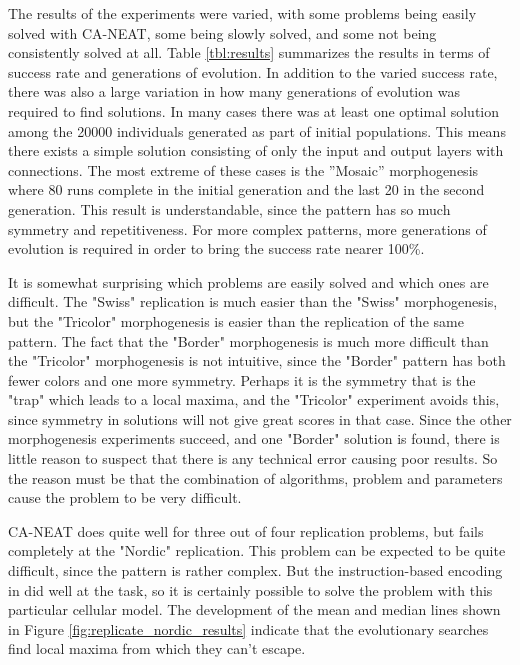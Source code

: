 The results of the experiments were varied, with some problems being easily solved with CA-NEAT, some being slowly solved, and some not being consistently solved at all.
Table \ref{tbl:results} summarizes the results in terms of success rate and generations of evolution.
In addition to the varied success rate, there was also a large variation in how many generations of evolution was required to find solutions.
In many cases there was at least one optimal solution among the 20000 individuals generated as part of initial populations.
This means there exists a simple solution consisting of only the input and output layers with connections. 
The most extreme of these cases is the ”Mosaic” morphogenesis where 80 runs complete in the initial generation and the last 20 in the second generation.
This result is understandable, since the pattern has so much symmetry and repetitiveness.
For more complex patterns, more generations of evolution is required in order to bring the success rate nearer 100\%.

It is somewhat surprising which problems are easily solved and which ones are difficult.
The "Swiss" replication is much easier than the "Swiss" morphogenesis,
but the "Tricolor" morphogenesis is easier than the replication of the same pattern.
The fact that the "Border" morphogenesis is much more difficult than the "Tricolor" morphogenesis is not intuitive,
since the "Border" pattern has both fewer colors and one more symmetry.
Perhaps it is the symmetry that is the "trap" which leads to a local maxima,
and the "Tricolor" experiment avoids this,
since symmetry in solutions will not give great scores in that case.
Since the other morphogenesis experiments succeed, and one "Border" solution is found,
there is little reason to suspect that there is any technical error causing poor results.
So the reason must be that the combination of algorithms, problem and parameters cause the problem to be very difficult.

CA-NEAT does quite well for three out of four replication problems, but fails completely at the "Nordic" replication.
This problem can be expected to be quite difficult, since the pattern is rather complex.
But the instruction-based encoding in \cite{nichele2014evolutionary} did well at the task,
so it is certainly possible to solve the problem with this particular cellular model.
The development of the mean and median lines shown in Figure \ref{fig:replicate_nordic_results} indicate that the evolutionary searches find local maxima from which they can't escape.

